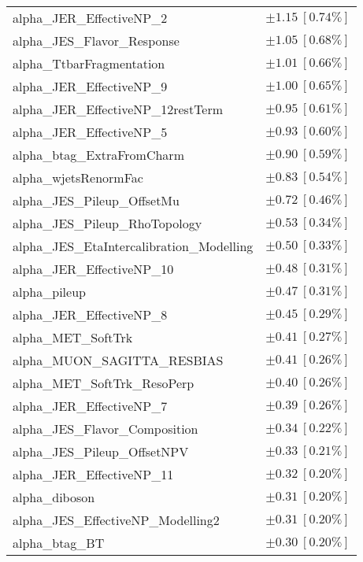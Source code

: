 \begin{table}
\begin{center}
\begin{tabular*}{\textwidth}{@{\extracolsep{\fill}}lc}
alpha\_JER\_EffectiveNP\_2         & $\pm 1.15\ [0.74\%] $       \\
alpha\_JES\_Flavor\_Response         & $\pm 1.05\ [0.68\%] $       \\
alpha\_TtbarFragmentation         & $\pm 1.01\ [0.66\%] $       \\
alpha\_JER\_EffectiveNP\_9         & $\pm 1.00\ [0.65\%] $       \\
alpha\_JER\_EffectiveNP\_12restTerm         & $\pm 0.95\ [0.61\%] $       \\
alpha\_JER\_EffectiveNP\_5         & $\pm 0.93\ [0.60\%] $       \\
alpha\_btag\_ExtraFromCharm         & $\pm 0.90\ [0.59\%] $       \\
alpha\_wjetsRenormFac         & $\pm 0.83\ [0.54\%] $       \\
alpha\_JES\_Pileup\_OffsetMu         & $\pm 0.72\ [0.46\%] $       \\
alpha\_JES\_Pileup\_RhoTopology         & $\pm 0.53\ [0.34\%] $       \\
alpha\_JES\_EtaIntercalibration\_Modelling         & $\pm 0.50\ [0.33\%] $       \\
alpha\_JER\_EffectiveNP\_10         & $\pm 0.48\ [0.31\%] $       \\
alpha\_pileup         & $\pm 0.47\ [0.31\%] $       \\
alpha\_JER\_EffectiveNP\_8         & $\pm 0.45\ [0.29\%] $       \\
alpha\_MET\_SoftTrk         & $\pm 0.41\ [0.27\%] $       \\
alpha\_MUON\_SAGITTA\_RESBIAS         & $\pm 0.41\ [0.26\%] $       \\
alpha\_MET\_SoftTrk\_ResoPerp         & $\pm 0.40\ [0.26\%] $       \\
alpha\_JER\_EffectiveNP\_7         & $\pm 0.39\ [0.26\%] $       \\
alpha\_JES\_Flavor\_Composition         & $\pm 0.34\ [0.22\%] $       \\
alpha\_JES\_Pileup\_OffsetNPV         & $\pm 0.33\ [0.21\%] $       \\
alpha\_JER\_EffectiveNP\_11         & $\pm 0.32\ [0.20\%] $       \\
alpha\_diboson         & $\pm 0.31\ [0.20\%] $       \\
alpha\_JES\_EffectiveNP\_Modelling2         & $\pm 0.31\ [0.20\%] $       \\
alpha\_btag\_BT         & $\pm 0.30\ [0.20\%] $       \\

\end{tabular*}
\end{center}
\end{table}
